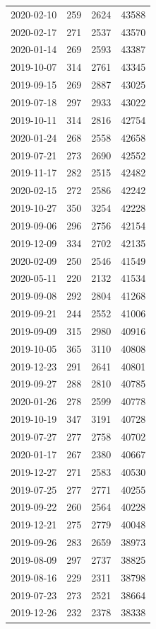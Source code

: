 \begin{tabular}{lrrr}
2020-02-10 & 259 & 2624 & 43588 \\
2020-02-17 & 271 & 2537 & 43570 \\
2020-01-14 & 269 & 2593 & 43387 \\
2019-10-07 & 314 & 2761 & 43345 \\
2019-09-15 & 269 & 2887 & 43025 \\
2019-07-18 & 297 & 2933 & 43022 \\
2019-10-11 & 314 & 2816 & 42754 \\
2020-01-24 & 268 & 2558 & 42658 \\
2019-07-21 & 273 & 2690 & 42552 \\
2019-11-17 & 282 & 2515 & 42482 \\
2020-02-15 & 272 & 2586 & 42242 \\
2019-10-27 & 350 & 3254 & 42228 \\
2019-09-06 & 296 & 2756 & 42154 \\
2019-12-09 & 334 & 2702 & 42135 \\
2020-02-09 & 250 & 2546 & 41549 \\
2020-05-11 & 220 & 2132 & 41534 \\
2019-09-08 & 292 & 2804 & 41268 \\
2019-09-21 & 244 & 2552 & 41006 \\
2019-09-09 & 315 & 2980 & 40916 \\
2019-10-05 & 365 & 3110 & 40808 \\
2019-12-23 & 291 & 2641 & 40801 \\
2019-09-27 & 288 & 2810 & 40785 \\
2020-01-26 & 278 & 2599 & 40778 \\
2019-10-19 & 347 & 3191 & 40728 \\
2019-07-27 & 277 & 2758 & 40702 \\
2020-01-17 & 267 & 2380 & 40667 \\
2019-12-27 & 271 & 2583 & 40530 \\
2019-07-25 & 277 & 2771 & 40255 \\
2019-09-22 & 260 & 2564 & 40228 \\
2019-12-21 & 275 & 2779 & 40048 \\
2019-09-26 & 283 & 2659 & 38973 \\
2019-08-09 & 297 & 2737 & 38825 \\
2019-08-16 & 229 & 2311 & 38798 \\
2019-07-23 & 273 & 2521 & 38664 \\
2019-12-26 & 232 & 2378 & 38338 \\

\end{tabular}
